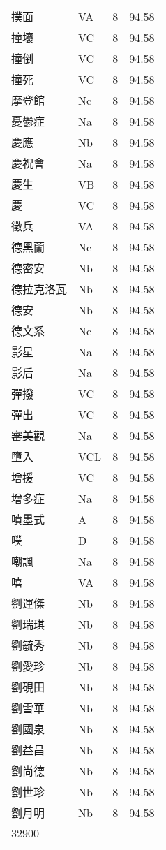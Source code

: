 \documentclass[twocolumn]{book}
\begin{document}
\begin{supertabular}{llrr}
撲面 & VA & 8 &  94.58\\
撞壞 & VC & 8 &  94.58\\
撞倒 & VC & 8 &  94.58\\
撞死 & VC & 8 &  94.58\\
摩登館 & Nc & 8 &  94.58\\
憂鬱症 & Na & 8 &  94.58\\
慶應 & Nb & 8 &  94.58\\
慶祝會 & Na & 8 &  94.58\\
慶生 & VB & 8 &  94.58\\
慶 & VC & 8 &  94.58\\
徵兵 & VA & 8 &  94.58\\
德黑蘭 & Nc & 8 &  94.58\\
德密安 & Nb & 8 &  94.58\\
德拉克洛瓦 & Nb & 8 &  94.58\\
德安 & Nb & 8 &  94.58\\
德文系 & Nc & 8 &  94.58\\
影星 & Na & 8 &  94.58\\
影后 & Na & 8 &  94.58\\
彈撥 & VC & 8 &  94.58\\
彈出 & VC & 8 &  94.58\\
審美觀 & Na & 8 &  94.58\\
墮入 & VCL & 8 &  94.58\\
增援 & VC & 8 &  94.58\\
增多症 & Na & 8 &  94.58\\
噴墨式 & A & 8 &  94.58\\
噗 & D & 8 &  94.58\\
嘲諷 & Na & 8 &  94.58\\
嘻 & VA & 8 &  94.58\\
劉運傑 & Nb & 8 &  94.58\\
劉瑞琪 & Nb & 8 &  94.58\\
劉毓秀 & Nb & 8 &  94.58\\
劉愛珍 & Nb & 8 &  94.58\\
劉硯田 & Nb & 8 &  94.58\\
劉雪華 & Nb & 8 &  94.58\\
劉國泉 & Nb & 8 &  94.58\\
劉益昌 & Nb & 8 &  94.58\\
劉尚德 & Nb & 8 &  94.58\\
劉世珍 & Nb & 8 &  94.58\\
劉月明 & Nb & 8 &  94.58\\
32900\\

\end{supertabular}
\end{document}
